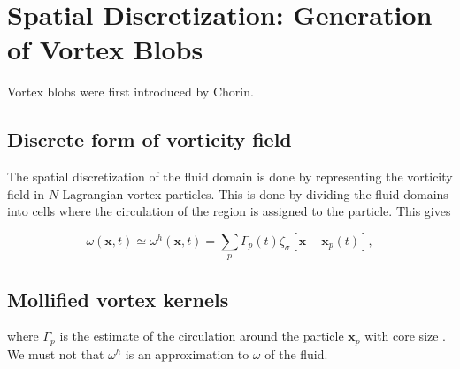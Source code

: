 


\section{Spatial Discretization: Generation of Vortex Blobs}

Vortex blobs were first introduced by Chorin.

\subsection{Discrete form of vorticity field}
The spatial discretization of the fluid domain is done by representing the vorticity field in $N$ Lagrangian vortex particles. This is done by dividing the fluid domains into cells where the circulation of the region is assigned to the particle. This gives 

\begin{equation}
\omega\left(\mathbf{x},t\right) \simeq \omega^h\left(\mathbf{x},t\right) = \sum_{p}\Gamma_p\left(t\right)\zeta_{\sigma}\left[\mathbf{x}-\mathbf{x}_p\left(t\right)\right],
\end{equation}

\subsection{Mollified vortex kernels}

where $\Gamma_p$  is the estimate of the circulation around the particle $\mathbf{x}_p$  with core size . We must not that $\omega^h$ is an approximation to $\omega$ of the fluid.

